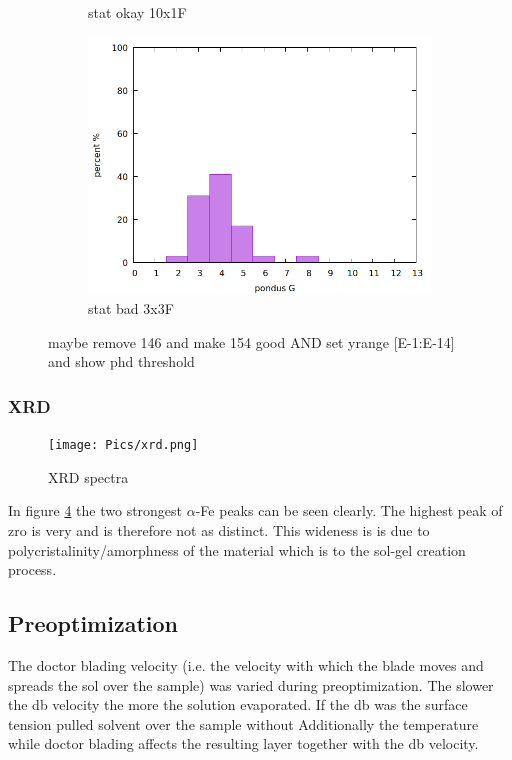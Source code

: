 \begin{figure}
\begin{subfigure}{.3\textwidth}
        \caption{stat okay 10x1F} \label{fig:stat1}
    \end{subfigure}
    \begin{subfigure}{.3\textwidth}
        \includegraphics[width=\textwidth]{Pics/iv/stat-156-bad-3x3F.png}
        \caption{stat bad 3x3F} \label{fig:stat3}
    \end{subfigure}
    \caption{maybe remove 146 and make 154 good AND set yrange [E-1:E-14] and show phd threshold} \label{fig:iv}
\end{figure}

\subsubsection{XRD}
\begin{figure}
	\centering
	\texttt{[image: Pics/xrd.png]}
	\caption{XRD spectra}
	\label{fig:xrd}
\end{figure}

In figure \ref{fig:xrd} the two strongest $\alpha$-Fe peaks can be seen clearly. 
The highest peak of \gls{zro} is very  and is therefore not as distinct. 
This wideness is is due to polycristalinity/amorphness of the material which is  to the sol-gel creation process. 

\subsection{Preoptimization}
The doctor blading velocity (i.e. the velocity with which the blade moves and spreads the sol over the sample) 
was varied during preoptimization. 
The slower the \gls{db} velocity the more  the solution evaporated. 
If the \gls{db} was  the surface tension pulled solvent over the sample without 
Additionally the temperature while doctor blading affects the resulting layer together with the \gls{db} velocity. 

